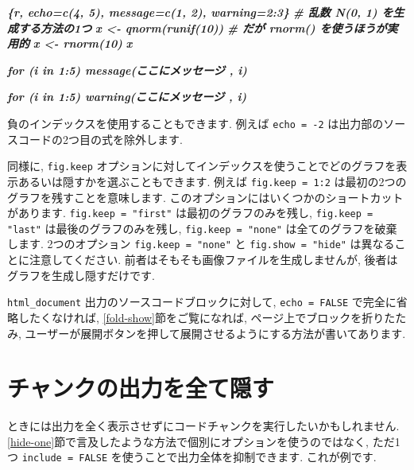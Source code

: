 \documentclass[
  11pt,
  lualatex,ja=standard,jafont=noto]{bxjsreport}
\newenvironment{Shaded}{\begin{snugshade}}{\end{snugshade}}
\newcommand{\InformationTok}[1]{\textcolor[rgb]{0.56,0.35,0.01}{\textbf{\textit{#1}}}}
\begin{document}
\begin{Shaded}
\begin{Highlighting}[]
\InformationTok{\textasciigrave{}\textasciigrave{}\textasciigrave{}\{r, echo=c(4, 5), message=c(1, 2), warning=2:3\}}
\InformationTok{\# 乱数 N(0, 1) を生成する方法の1つ}
\InformationTok{x \textless{}{-} qnorm(runif(10))}
\InformationTok{\# だが rnorm() を使うほうが実用的}
\InformationTok{x \textless{}{-} rnorm(10)}
\InformationTok{x}

\InformationTok{for (i in 1:5) message(\textquotesingle{}ここにメッセージ \textquotesingle{}, i)}

\InformationTok{for (i in 1:5) warning(\textquotesingle{}ここにメッセージ \textquotesingle{}, i)}
\InformationTok{\textasciigrave{}\textasciigrave{}\textasciigrave{}}
\end{Highlighting}
\end{Shaded}

負のインデックスを使用することもできます. 例えば \texttt{echo = -2} は出力部のソースコードの2つ目の式を除外します.

同様に, \texttt{fig.keep} オプションに対してインデックスを使うことでどのグラフを表示あるいは隠すかを選ぶこともできます. 例えば \texttt{fig.keep = 1:2} は最初の2つのグラフを残すことを意味します. このオプションにはいくつかのショートカットがあります. \texttt{fig.keep = "first"} は最初のグラフのみを残し, \texttt{fig.keep = "last"} は最後のグラフのみを残し, \texttt{fig.keep = "none"} は全てのグラフを破棄します. 2つのオプション \texttt{fig.keep = "none"} と \texttt{fig.show = "hide"} は異なることに注意してください. 前者はそもそも画像ファイルを生成しませんが, 後者はグラフを生成し隠すだけです.

\texttt{html\_document} 出力のソースコードブロックに対して, \texttt{echo = FALSE} で完全に省略したくなければ, \ref{fold-show}節をご覧になれば, ページ上でブロックを折りたたみ, ユーザーが展開ボタンを押して展開させるようにする方法が書いてあります.

\hypertarget{hide-all}{%
\section{チャンクの出力を全て隠す}\label{hide-all}}

ときには出力を全く表示させずにコードチャンクを実行したいかもしれません. \ref{hide-one}節で言及したような方法で個別にオプションを使うのではなく, ただ1つ \texttt{include = FALSE} を使うことで出力全体を抑制できます. これが例です.
\end{document}
